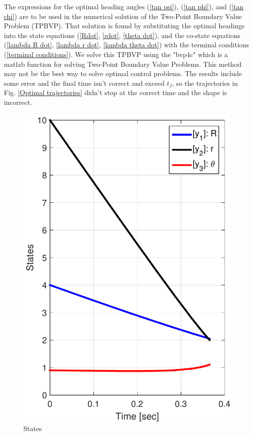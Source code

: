 The expressions for the optimal heading angles (\ref{tan psi}), (\ref{tan phi}), and (\ref{tan chi}) are to be used in the numerical solution of the Two-Point Boundary Value Problem (TPBVP). That solution is found by substituting the optimal headings into the state equations (\ref{Rdot}, \ref{rdot}, \ref{theta dot}), and the co-state equations (\ref{lambda R dot}, \ref{lambda r dot}, \ref{lambda theta dot})  with the terminal conditions (\ref{terminal conditions}). We solve this TPBVP using the "bvp4c" which is a matlab function for solving Two-Point Boundary Value Problems. This method may not be the best way to solve optimal control problems. The results include some error and the final time isn't correct and exceed $t_f$, so the trajectories in Fig. \ref{Optimal trajectories} didn't stop at the correct time and the shape is incorrect.



\begin{figure}[H]
	\centering
	\includegraphics[scale = 0.5]{fig/fig7a_paper.pdf}
	\caption{States}
\end{figure}


